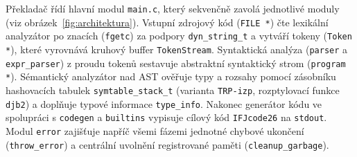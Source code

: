 \documentclass[11pt, a4paper]{article}
\begin{document}
Překladač řídí hlavní modul \texttt{main.c}, který sekvenčně zavolá jednotlivé moduly (viz obrázek~\ref{fig:architektura}). Vstupní zdrojový kód (\texttt{FILE *}) čte lexikální analyzátor po znacích (\texttt{fgetc}) za podpory \texttt{dyn\_string\_t} a vytváří tokeny (\texttt{Token *}), které vyrovnává kruhový buffer \texttt{TokenStream}. Syntaktická analýza (\texttt{parser} a \texttt{expr\_parser}) z proudu tokenů sestavuje abstraktní syntaktický strom (\texttt{program *}). Sémantický analyzátor nad AST ověřuje typy a rozsahy pomocí zásobníku hashovacích tabulek \texttt{symtable\_stack\_t} (varianta \texttt{TRP-izp}, rozptylovací funkce \texttt{djb2}) a doplňuje typové informace \texttt{type\_info}. Nakonec generátor kódu ve spolupráci s \texttt{codegen} a \texttt{builtins} vypisuje cílový kód \texttt{IFJcode26} na \texttt{stdout}. Modul \texttt{error} zajišťuje napříč všemi fázemi jednotné chybové ukončení (\texttt{throw\_error}) a centrální uvolnění registrované paměti (\texttt{cleanup\_garbage}).

\vfill
\end{document}
